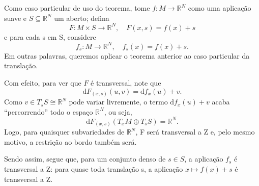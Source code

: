 \documentclass[../differential_topology.tex]{subfiles}
\begin{document}
\begin{example}
	Como caso particular de uso do teorema, tome \(f:M\rightarrow \mathbb{R}^{N}\) como uma aplicação suave e \(S\subseteq \mathbb{R}^{N}\) um aberto; defina
	\[
		F:M\times S\rightarrow \mathbb{R}^{N}, \quad F(x, s) = f(x) + s
	\]
	e para cada s em S, considere
	\[
		f_{s}:M\rightarrow \mathbb{R}^{N}, \quad f_{s}(x) = f(x) + s.
	\]
	Em outras palavras, queremos aplicar o teorema anterior ao caso particular da translação.

	Com efeito, para ver que \(F\) é transversal, note que
	\[
		\mathrm{d}F_{(x, s)}(u, v) = \mathrm{d}f_{x}(u) + v.
	\]
	Como \(v\in T_{s}S\cong \mathbb{R}^{N}\) pode variar livremente, o termo \(\mathrm{d}f_{x}(u)+v\) acaba ``percorrendo'' todo o espaço \(\mathbb{R}^{N}\), ou seja,
	\[
		\mathrm{d}F_{(x, s)}(T_{x}M \oplus T_{s}S)=\mathbb{R}^{N}.
	\]
	Logo, para quaisquer subvariedades de \(\mathbb{R}^{N}\), F será transversal a Z e, pelo mesmo motivo, a restrição ao bordo também será.

	Sendo assim, segue que, para um conjunto denso de \(s\in S\), a aplicação \(f_{s}\) é transversal a Z: para quase toda translação s, a aplicação \(x\mapsto f(x)+s\) é transversal a Z.
\end{example}
\end{document}
